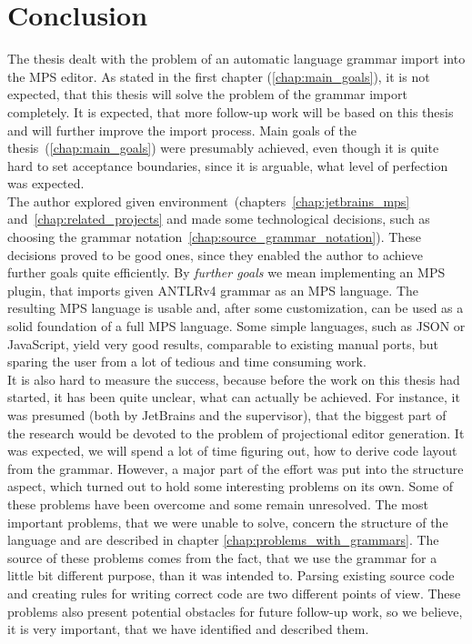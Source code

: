 \chapter{Conclusion}

The thesis dealt with the problem of an automatic language grammar import into the MPS editor.
As stated in the first chapter (\ref{chap:main_goals}), it is not expected, that this thesis will solve the problem of the grammar import completely.
It is expected, that more follow-up work will be based on this thesis and will further improve the import process.
Main goals of the thesis~(\ref{chap:main_goals}) were presumably achieved, even though it is quite hard to set acceptance boundaries, since it is arguable, what level of perfection was expected.
\\

The author explored given environment~(chapters~\ref{chap:jetbrains_mps} and~\ref{chap:related_projects} and made some technological decisions, such as choosing the grammar notation~\ref{chap:source_grammar_notation}).
These decisions proved to be good ones, since they enabled the author to achieve further goals quite efficiently.
By \textit{further goals} we mean implementing an MPS plugin, that imports given ANTLRv4 grammar as an MPS language.
The resulting MPS language is usable and, after some customization, can be used as a solid foundation of a full MPS language.
Some simple languages, such as JSON or JavaScript, yield very good results, comparable to existing manual ports, but sparing the user from a lot of tedious and time consuming work.
\\

It is also hard to measure the success, because before the work on this thesis had started, it has been quite unclear, what can actually be achieved.
For instance, it was presumed (both by JetBrains and the supervisor), that the biggest part of the research would be devoted to the problem of projectional editor generation.
It was expected, we will spend a lot of time figuring out, how to derive code layout from the grammar.
However, a major part of the effort was put into the structure aspect, which turned out to hold some interesting problems on its own.
Some of these problems have been overcome and some remain unresolved.
The most important problems, that we were unable to solve, concern the structure of the language and are described in chapter \ref{chap:problems_with_grammars}.
The source of these problems comes from the fact, that we use the grammar for a little bit different purpose, than it was intended to.
Parsing existing source code and creating rules for writing correct code are two different points of view.
These problems also present potential obstacles for future follow-up work, so we believe, it is very important, that we have identified and described them.
